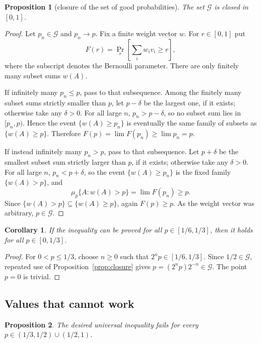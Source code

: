 \documentclass[12pt]{article}
\newtheorem{proposition}{Proposition}
\newtheorem{corollary}{Corollary}
\begin{document}
\begin{proposition}[closure of the set of good probabilities]\label{prop:closed}
The set \(\mathcal G\) is closed in \([0,1]\).
\end{proposition}

\begin{proof}
Let \(p_n\in\mathcal G\) and \(p_n\to p\).  Fix a finite weight vector \(w\).
For \(r\in[0,1]\) put
\[
        F(r)=\Pr_r\!\left[\sum_i w_i v_i\ge r\right],
\]
where the subscript denotes the Bernoulli parameter.  There are only finitely
many subset sums \(w(A)\).

If infinitely many \(p_n\le p\), pass to that subsequence.  Among the finitely
many subset sums strictly smaller than \(p\), let \(p-\delta\) be the largest
one, if it exists; otherwise take any \(\delta>0\).  For all large \(n\),
\(p_n>p-\delta\), so no subset sum lies in \([p_n,p)\).  Hence the
event \(\{w(A)\ge p_n\}\) is eventually the same family of subsets as
\(\{w(A)\ge p\}\).  Therefore \(F(p)=\lim F(p_n)\ge\lim p_n=p\).

If instead infinitely many \(p_n>p\), pass to that subsequence.  Let \(p+\delta\)
be the smallest subset sum strictly larger than \(p\), if it exists; otherwise
take any \(\delta>0\).  For all large \(n\), \(p_n<p+\delta\), so the event
\(\{w(A)\ge p_n\}\) is the fixed family \(\{w(A)>p\}\), and
\[
       \mu_p\{A:w(A)>p\}=\lim F(p_n)\ge p .
\]
Since \(\{w(A)>p\}\subseteq\{w(A)\ge p\}\), again \(F(p)\ge p\).  As the weight
vector was arbitrary, \(p\in\mathcal G\).
\end{proof}

\begin{corollary}\label{cor:base}
If the inequality can be proved for all \(p\in[1/6,1/3]\), then it holds for
all \(p\in[0,1/3]\).
\end{corollary}

\begin{proof}
For \(0<p\le1/3\), choose \(n\ge0\) such that \(2^n p\in[1/6,1/3]\).  Since
\(1/2\in\mathcal G\), repeated use of Proposition~\ref{prop:closure} gives
\(p=(2^n p)2^{-n}\in\mathcal G\).  The point \(p=0\) is trivial.
\end{proof}

\subsection*{Values that cannot work}

\begin{proposition}\label{prop:negative}
The desired universal inequality fails for every
\(p\in(1/3,1/2)\cup(1/2,1)\).
\end{proposition}
\end{document}
